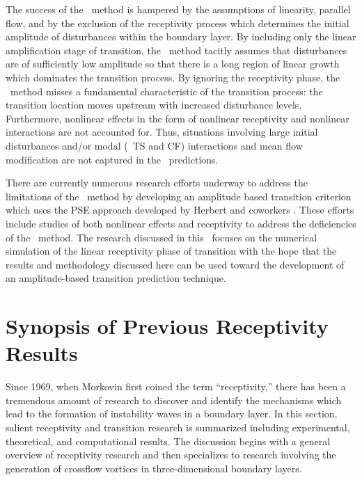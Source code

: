 The success of the \eton\ method is hampered by the assumptions of linearity,
parallel flow, and by the exclusion of the receptivity process which
determines the initial amplitude of disturbances within the boundary layer.
By including only the linear amplification stage of transition, the \eton\
method tacitly assumes that disturbances are of sufficiently low amplitude so
that there is a long region of linear growth which dominates the transition
process.  By ignoring the receptivity phase, the \eton\ method misses a
fundamental characteristic of the transition process: the transition location
moves upstream with increased disturbance levels.  Furthermore, nonlinear
effects in the form of nonlinear receptivity and nonlinear interactions are
not accounted for.  Thus, situations involving large initial disturbances
and/or modal (\eg\ TS and CF) interactions and mean flow modification are not
captured in the \eton\ predictions.

There are currently numerous research efforts underway to address the
limitations of the \eton\ method by developing an amplitude based transition
criterion which uses the PSE approach developed by Herbert and coworkers
\cite{Herbert:91}.  These efforts include studies of both nonlinear effects
and receptivity to address the deficiencies of the \eton\ method.  The
research discussed in this \thesis\ focuses on the numerical simulation of the
linear receptivity phase of transition with the hope that the results and
methodology discussed here can be used toward the development of an
amplitude-based transition prediction technique.

\section{Synopsis of Previous Receptivity Results \label{s:previous}}

Since 1969, when Morkovin \cite{Morkovin:69} first coined the term
``receptivity,'' there has been a tremendous amount of research to discover
and identify the mechanisms which lead to the formation of instability waves
in a boundary layer.  In this section, salient receptivity and transition
research is summarized including experimental, theoretical, and computational
results.  The discussion begins with a general overview of receptivity
research and then specializes to research involving the generation of
crossflow vortices in three-dimensional boundary layers.

